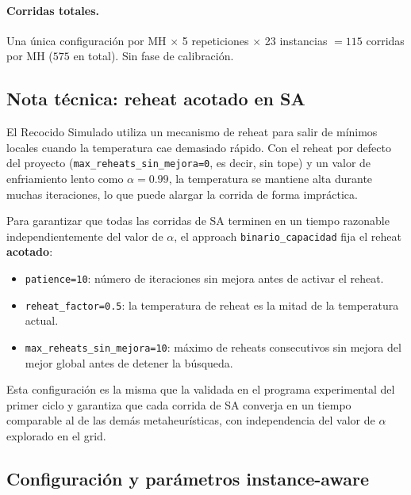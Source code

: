 \paragraph{Corridas totales.}
Una única configuración por MH $\times$ 5 repeticiones $\times$ 23 instancias
$= 115$ corridas por MH ($575$ en total). Sin fase de calibración.

\subsection{Nota técnica: reheat acotado en SA}
\label{nota:reheat-acotado-binario-capacidad}

El Recocido Simulado utiliza un mecanismo de reheat para salir de
mínimos locales cuando la temperatura cae demasiado rápido. Con el
reheat por defecto del proyecto (\texttt{max\_reheats\_sin\_mejora=0},
es decir, sin tope) y un valor de enfriamiento lento como
$\alpha = 0.99$, la temperatura se mantiene alta durante muchas
iteraciones, lo que puede alargar la corrida de forma impráctica.

Para garantizar que todas las corridas de SA terminen en un tiempo
razonable independientemente del valor de $\alpha$, el approach
\texttt{binario\_capacidad} fija el reheat \textbf{acotado}:

\begin{itemize}
\item \texttt{patience=10}: número de iteraciones sin mejora antes de
  activar el reheat.
\item \texttt{reheat\_factor=0.5}: la temperatura de reheat es la mitad
  de la temperatura actual.
\item \texttt{max\_reheats\_sin\_mejora=10}: máximo de reheats
  consecutivos sin mejora del mejor global antes de detener la búsqueda.
\end{itemize}

Esta configuración es la misma que la validada en el programa
experimental del primer ciclo y garantiza que cada corrida de SA
converja en un tiempo comparable al de las demás metaheurísticas,
con independencia del valor de $\alpha$ explorado en el grid.

\subsection{Configuración y parámetros instance-aware}

